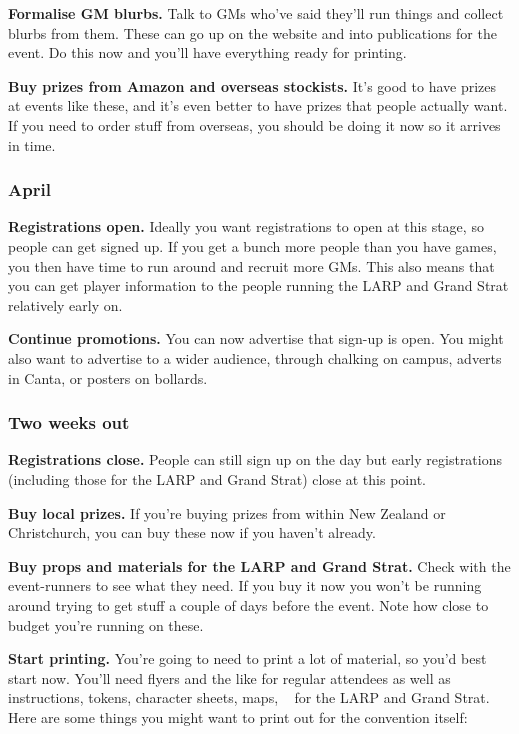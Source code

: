 \textbf{Formalise GM blurbs.} Talk to GMs who've said they'll run things and collect blurbs from them. These can go up on the website and into publications for the event. Do this now and you'll have everything ready for printing.

\textbf{Buy prizes from Amazon and overseas stockists.} It's good to have prizes at events like these, and it's even better to have prizes that people actually want. If you need to order stuff from overseas, you should be doing it now so it arrives in time.

\subsubsection{April}

\textbf{Registrations open.} Ideally you want registrations to open at this stage, so people can get signed up. If you get a bunch more people than you have games, you then have time to run around and recruit more GMs. This also means that you can get player information to the people running the LARP and Grand Strat relatively early on.

\textbf{Continue promotions.} You can now advertise that sign-up is open. You might also want to advertise to a wider audience, \eg through chalking on campus, adverts in Canta, or posters on bollards.

\subsubsection{Two weeks out}

\textbf{Registrations close.} People can still sign up on the day but early registrations (including those for the LARP and Grand Strat) close at this point.

\textbf{Buy local prizes.} If you're buying prizes from within New Zealand or Christchurch, you can buy these now if you haven't already.

\textbf{Buy props and materials for the LARP and Grand Strat.} Check with the event-runners to see what they need. If you buy it now you won't be running around trying to get stuff a couple of days before the event. Note how close to budget you're running on these.

\textbf{Start printing.} You're going to need to print a lot of material, so you'd best start now. You'll need flyers and the like for regular attendees as well as instructions, tokens, character sheets, maps, \etc~ for the LARP and Grand Strat. Here are some things you might want to print out for the convention itself:

